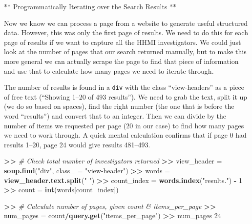 \documentclass[]{krantz}
\newenvironment{Shaded}{\begin{snugshade}}{\end{snugshade}}
\newcommand{\KeywordTok}[1]{\textcolor[rgb]{0.13,0.29,0.53}{\textbf{#1}}}
\newcommand{\DataTypeTok}[1]{\textcolor[rgb]{0.13,0.29,0.53}{#1}}
\newcommand{\DecValTok}[1]{\textcolor[rgb]{0.00,0.00,0.81}{#1}}
\newcommand{\StringTok}[1]{\textcolor[rgb]{0.31,0.60,0.02}{#1}}
\newcommand{\CommentTok}[1]{\textcolor[rgb]{0.56,0.35,0.01}{\textit{#1}}}
\newcommand{\OperatorTok}[1]{\textcolor[rgb]{0.81,0.36,0.00}{\textbf{#1}}}
\newcommand{\ErrorTok}[1]{\textcolor[rgb]{0.64,0.00,0.00}{\textbf{#1}}}
\newcommand{\NormalTok}[1]{#1}
\begin{document}
** Programmatically Iterating over the Search Results **

Now we know we can process a page from a website to generate useful
structured data. However, this was only the first page of results. We
need to do this for each page of results if we want to capture all the
HHMI investigators. We could just look at the number of pages that our
search returned manually, but to make this more general we can actually
scrape the page to find that piece of information and use that to
calculate how many pages we need to iterate through.

The number of results is found in a \texttt{div} with the class
``view-headers'' as a piece of free text (``Showing 1--20 of 493
results''). We need to grab the text, split it up (we do so based on
spaces), find the right number (the one that is before the word
``results'') and convert that to an integer. Then we can divide by the
number of items we requested per page (20 in our case) to find how many
pages we need to work through. A quick mental calculation confirms that
if page 0 had results 1--20, page 24 would give results 481--493.

\begin{Shaded}
\begin{Highlighting}[]
\OperatorTok{>}\ErrorTok{>}\StringTok{ }\CommentTok{# Check total number of investigators returned}
\ErrorTok{>>}\StringTok{ }\NormalTok{view_header =}\StringTok{ }\KeywordTok{soup.find}\NormalTok{(}\StringTok{"div"}\NormalTok{, }\DataTypeTok{class_ =} \StringTok{"view-header"}\NormalTok{)}
\OperatorTok{>}\ErrorTok{>}\StringTok{ }\NormalTok{words =}\StringTok{ }\KeywordTok{view_header.text.split}\NormalTok{(}\StringTok{" "}\NormalTok{)}
\OperatorTok{>}\ErrorTok{>}\StringTok{ }\NormalTok{count_index =}\StringTok{ }\KeywordTok{words.index}\NormalTok{(}\StringTok{"results."}\NormalTok{) }\OperatorTok{-}\StringTok{ }\DecValTok{1}
\OperatorTok{>}\ErrorTok{>}\StringTok{ }\NormalTok{count =}\StringTok{ }\KeywordTok{int}\NormalTok{(words[count_index])}

\OperatorTok{>}\ErrorTok{>}\StringTok{ }\CommentTok{# Calculate number of pages, given count & items_per_page}
\ErrorTok{>>}\StringTok{ }\NormalTok{num_pages =}\StringTok{ }\NormalTok{count}\OperatorTok{/}\KeywordTok{query.get}\NormalTok{(}\StringTok{"items_per_page"}\NormalTok{)}
\OperatorTok{>}\ErrorTok{>}\StringTok{ }\NormalTok{num_pages}
\DecValTok{24}
\end{Highlighting}
\end{Shaded}
\end{document}
